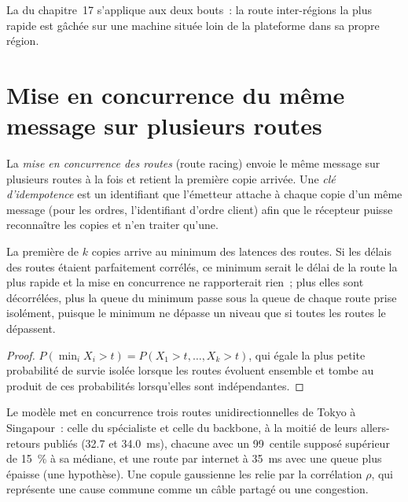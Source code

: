 La  du chapitre~17 s'applique aux deux bouts~: la route inter-régions la plus rapide est gâchée sur une machine située loin de la plateforme
dans sa propre région.

\section{Mise en concurrence du même message sur plusieurs routes}

\begin{definition}\label{def:nw:cross-region-crypto-networks:idem}
La \emph{mise en concurrence des routes} (route racing) envoie le même message sur plusieurs routes à la fois et retient la
première copie arrivée. Une \emph{clé d'idempotence} est un identifiant que l'émetteur attache à chaque copie d'un même message (pour
les ordres, l'identifiant d'ordre client) afin que le récepteur puisse reconnaître les copies et n'en traiter qu'une.
\end{definition}

\begin{proposition}\label{prop:nw:cross-region-crypto-networks:race}
La première de $k$ copies arrive au minimum des latences des routes. Si les délais des routes étaient parfaitement corrélés, ce minimum serait le
délai de la route la plus rapide et la mise en concurrence ne rapporterait rien~; plus elles sont décorrélées, plus la queue du minimum passe sous la queue de chaque route
prise isolément, puisque le minimum ne dépasse un niveau que si toutes les routes le dépassent.
\end{proposition}

\begin{proof}
$P(\min_i X_i > t) = P(X_1 > t, \dots, X_k > t)$, qui égale la plus petite probabilité de survie isolée lorsque les routes évoluent ensemble et tombe
au produit de ces probabilités lorsqu'elles sont indépendantes.
\end{proof}

Le modèle met en concurrence trois routes unidirectionnelles de Tokyo à Singapour~: celle du spécialiste et celle du backbone, à la moitié de leurs allers-retours publiés (32.7 et
\qty{34.0}{\milli\second}), chacune avec un 99~centile supposé supérieur de 15~\% à sa médiane, et une route par internet à \qty{35}{\milli\second} avec une
queue plus épaisse (une hypothèse). Une copule gaussienne les relie par la corrélation $\rho$, qui représente une cause commune comme un câble partagé ou une congestion.

